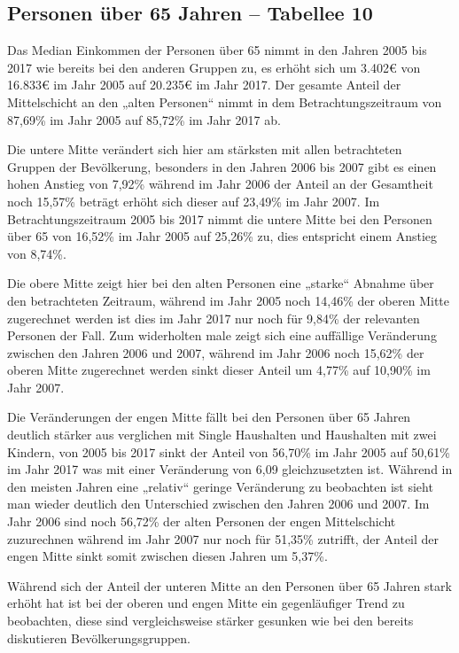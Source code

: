 \documentclass[12pt,]{article}
\newcommand{\euro}{€}
\begin{document}
\subsection{Personen über 65 Jahren -- Tabellee
10}\label{personen-uber-65-jahren-tabellee-10}

Das Median Einkommen der Personen über 65 nimmt in den Jahren 2005 bis
2017 wie bereits bei den anderen Gruppen zu, es erhöht sich um
3.402\euro{} von 16.833\euro{} im Jahr 2005 auf 20.235\euro{} im Jahr
2017. Der gesamte Anteil der Mittelschicht an den „alten Personen``
nimmt in dem Betrachtungszeitraum von 87,69\% im Jahr 2005 auf 85,72\%
im Jahr 2017 ab.

Die untere Mitte verändert sich hier am stärksten mit allen betrachteten
Gruppen der Bevölkerung, besonders in den Jahren 2006 bis 2007 gibt es
einen hohen Anstieg von 7,92\% während im Jahr 2006 der Anteil an der
Gesamtheit noch 15,57\% beträgt erhöht sich dieser auf 23,49\% im Jahr
2007. Im Betrachtungszeitraum 2005 bis 2017 nimmt die untere Mitte bei
den Personen über 65 von 16,52\% im Jahr 2005 auf 25,26\% zu, dies
entspricht einem Anstieg von 8,74\%.

Die obere Mitte zeigt hier bei den alten Personen eine „starke`` Abnahme
über den betrachteten Zeitraum, während im Jahr 2005 noch 14,46\% der
oberen Mitte zugerechnet werden ist dies im Jahr 2017 nur noch für
9,84\% der relevanten Personen der Fall. Zum widerholten male zeigt sich
eine auffällige Veränderung zwischen den Jahren 2006 und 2007, während
im Jahr 2006 noch 15,62\% der oberen Mitte zugerechnet werden sinkt
dieser Anteil um 4,77\% auf 10,90\% im Jahr 2007.

Die Veränderungen der engen Mitte fällt bei den Personen über 65 Jahren
deutlich stärker aus verglichen mit Single Haushalten und Haushalten mit
zwei Kindern, von 2005 bis 2017 sinkt der Anteil von 56,70\% im Jahr
2005 auf 50,61\% im Jahr 2017 was mit einer Veränderung von 6,09
gleichzusetzten ist. Während in den meisten Jahren eine „relativ``
geringe Veränderung zu beobachten ist sieht man wieder deutlich den
Unterschied zwischen den Jahren 2006 und 2007. Im Jahr 2006 sind noch
56,72\% der alten Personen der engen Mittelschicht zuzurechnen während
im Jahr 2007 nur noch für 51,35\% zutrifft, der Anteil der engen Mitte
sinkt somit zwischen diesen Jahren um 5,37\%.

Während sich der Anteil der unteren Mitte an den Personen über 65 Jahren
stark erhöht hat ist bei der oberen und engen Mitte ein gegenläufiger
Trend zu beobachten, diese sind vergleichsweise stärker gesunken wie bei
den bereits diskutieren Bevölkerungsgruppen.
\end{document}
